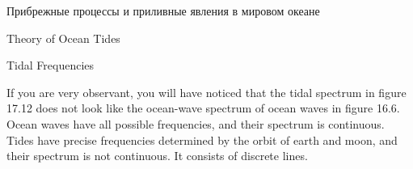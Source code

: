 \begin{chapter}{Прибрежные процессы и приливные явления в мировом океане}
\begin{section}{Theory of Ocean Tides}
\begin{paragraph}{Tidal Frequencies}

If you are very observant, you will have noticed that the tidal
spectrum in figure 17.12 does not look like the ocean-wave spectrum of
ocean waves in figure 16.6. Ocean waves have all possible frequencies,
and their spectrum is continuous. Tides have precise frequencies
determined by the orbit of earth and moon, and their
spectrum is not continuous. It consists of discrete lines.
%


\end{paragraph}
\end{section}
\end{chapter}
